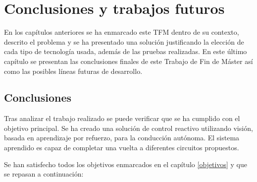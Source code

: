 \chapter{Conclusiones y trabajos futuros}

En los capítulos anteriores se ha enmarcado este TFM dentro de su contexto, descrito el problema y se ha presentado una solución justificando la elección de cada tipo de tecnología usada, además de las pruebas realizadas. En este último capítulo se presentan las conclusiones finales de este Trabajo de Fin de Máster así como las posibles líneas futuras de desarrollo.

\section{Conclusiones}

Tras analizar el trabajo realizado se puede verificar que se ha cumplido con el objetivo principal. Se ha creado una solución de control reactivo utilizando visión, basada en aprendizaje por refuerzo, para la conducción autónoma. El sistema aprendido es capaz de completar una vuelta a diferentes circuitos propuestos.


Se han satisfecho todos los objetivos enmarcados en el capítulo \ref{objetivos} y que se repasan a continuación:\\

